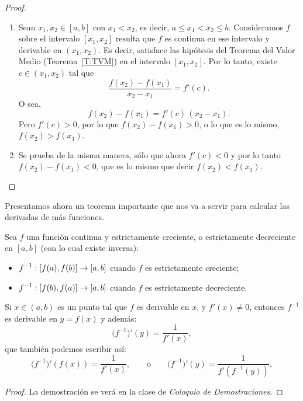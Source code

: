\begin{proof}
    \begin{enumerate}
        \item Sean $x_1,x_2\in[a,b]$ con $x_1<x_2$, es decir, $a\le x_1<x_2\le b$. Consideramos $f$ sobre el intervalo $[x_1,x_2]$ resulta que $f$ es continua en ese intervalo y derivable en $(x_1,x_2)$. Es decir, satisface las hipótesis del Teorema del Valor Medio (Teorema~\ref{T:TVM}) en el intervalo $[x_1,x_2]$.
        Por lo tanto, existe $c\in(x_1,x_2)$ tal que 
        \[
        \frac{f(x_2)-f(x_1)}{x_2-x_1} = f'(c).
        \]
        O sea,
        \[
        f(x_2)-f(x_1) = f'(c)\, (x_2-x_1).
        \]
        Pero $f'(c)>0$, por lo que $f(x_2)-f(x_1)>0$, o lo que es lo mismo, $f(x_2)>f(x_1)$.
        
        \item Se prueba de la misma manera, sólo que ahora $f'(c)<0$ y por lo tanto $f(x_2)-f(x_1)<0$, que es lo mismo que decir $f(x_2)<f(x_1)$.\qedhere
    \end{enumerate}
\end{proof}

Presentamos ahora un teorema importante que nos va a servir para calcular las derivadas de más funciones.

\begin{theorem}
    Sea $f$ una función continua y estrictamente creciente, o estrictamente decreciente en $[a,b]$ (con lo cual existe inversa):
    \begin{itemize}
        \item $\displaystyle f^{-1}:[f(a),f(b)]\to [a,b]$ cuando $f$ es estrictamente creciente;
        \item $\displaystyle f^{-1}:[f(b),f(a)]\to [a,b]$ cuando $f$ es estrictamente decreciente.
    \end{itemize}
    Si $x\in(a,b)$ es un punto tal que $f$ es derivable en $x$, y $f'(x)\neq 0$, entonces $f^{-1}$ es derivable en $y=f(x)$ y además:
    \[
    \big(f^{-1}\big)'(y) = \frac1{f'(x)},
    \]
    que también podemos escribir así:
    \begin{equation}\label{eq:derivada inversa}
    \big(f^{-1}\big)'(f(x)) = \frac1{f'(x)},
    \qquad\text{o}\qquad
    \big(f^{-1}\big)'(y) = \frac1{f'(f^{-1}(y))},
    \end{equation}
\end{theorem}

\begin{proof}
    La demostración se verá en la clase de \emph{Coloquio de Demostraciones}.
\end{proof}

